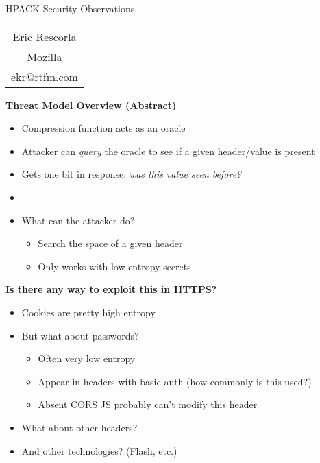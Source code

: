 \documentclass[helvetica]{seminar}
\newcommand{\heading}[1]{%
  \begin{center} 
    \large\bf 
    #1 
  \end{center} 
  \vspace{.4 in}}
\begin{document}
\begin{slide}
\begin{center}
\vspace{.5 in}
\LARGE{{\bf}HPACK Security Observations}\\
\vspace{.2in}
\vspace{3em}
\large{
\begin{tabular}{c}
Eric Rescorla\\
Mozilla\\
\url{ekr@rtfm.com}
\end{tabular}
}
\end{center}

\end{slide}

\centerslidesfalse 


\begin{slide}
\heading{Threat Model Overview (Abstract)}

\begin{itemize}
\item Compression function acts as an oracle
\item Attacker can \emph{query} the oracle to see if a given header/value is present
\item Gets one bit in response: \emph{was this value seen before?}
\item[]
\item What can the attacker do?
  \begin{itemize}
  \item Search the space of a given header
  \item Only works with low entropy secrets
  \end{itemize}
\end{itemize}
\end{slide}


\begin{slide}
\heading{Is there any way to exploit this in HTTPS?}

\begin{itemize}
\item Cookies are pretty high entropy
\item But what about passwords?
  \begin{itemize}
  \item Often very low entropy
  \item Appear in headers with basic auth (how commonly is this used?)
  \item Absent CORS JS probably can't modify this header
  \end{itemize}
\item What about other headers?
\item And other technologies? (Flash, etc.)
\end{itemize}
\end{slide}
\end{document}
